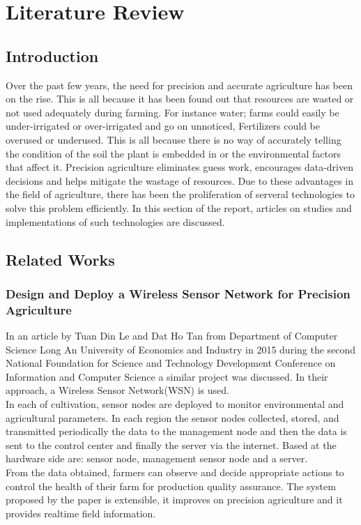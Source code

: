\documentclass[12pt, a4paper]{article}
\begin{document}
\section{Literature Review}
\subsection{Introduction}
Over the past few years, the need for precision and accurate agriculture has been on the rise. This is all because it has been found out that resources are wasted or not used adequately during farming. For instance water; farms could easily be under-irrigated or over-irrigated and go on unnoticed, Fertilizers could be overused or underused. This is all because there is no way of accurately telling the condition of the soil the plant is embedded in or the environmental factors that affect it. Precision agriculture eliminates guess work, encourages data-driven decisions and helps mitigate the wastage of resources. Due to these advantages in the field of agriculture, there has been the proliferation of serveral technologies to solve this problem efficiently. In this section of the report, articles on studies and implementations of such technologies are discussed.

\subsection{Related Works}
\subsubsection{Design and Deploy a Wireless Sensor Network for Precision Agriculture}
In an article by Tuan Din Le and Dat Ho Tan \cite{7302210} from Department of Computer Science Long An University of Economics and Industry in 2015 during the second National Foundation for Science and Technology Development Conference on Information and Computer Science a similar project was discussed. In their approach, a Wireless Sensor Network(WSN) is used.\\ 
In each of cultivation, sensor nodes are deployed to monitor environmental and agricultural parameters. In each region the sensor nodes collected, stored, and transmitted periodically the data to the management node and then the data is sent to the control center and finally the server via the internet. Based at the hardware side are: sensor node, management sensor node and a server.\\
From the data obtained, farmers can observe and decide appropriate actions to control the health of their farm for production quality assurance. The system proposed by the paper is extensible, it improves on precision agriculture and it provides realtime field information.
\end{document}
